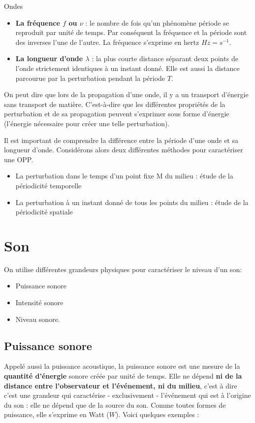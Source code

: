 \documentclass[11pt,a4paper]{article}
\begin{document}
\begin{defn}{Ondes}
\begin{itemize}
\begin{itemize}
        \item \textbf{La fréquence $f$ ou $\nu$} : le nombre de fois qu’un phénomène période se reproduit par unité de temps. Par conséquent la fréquence et la période sont des inverses l’une de l’autre. La fréquence s'exprime en hertz $Hz = s^{-1}$. 
        \item \textbf{La longueur d'onde $\lambda$ }: la plus courte distance séparant deux points de l’onde strictement identiques à un instant donné. Elle est aussi la distance parcourue par la perturbation pendant la période $T$. 
    \end{itemize}
\end{itemize}
\end{defn}
On peut dire que lors de la propagation d'une onde, il y a un transport d'énergie sans transport de matière. C’est-à-dire que les différentes propriétés de la perturbation et de sa propagation peuvent s'exprimer sous forme d'énergie (l'énergie nécessaire pour créer une telle perturbation). 
\begin{rmrq}
Il est important de comprendre la différence entre la période d’une onde et sa longueur d’onde. Considérons alors deux différentes méthodes pour caractériser une OPP. \begin{itemize}
    \item La  perturbation dans le temps d’un point fixe M du milieu : étude de la périodicité temporelle
    \item La perturbation à un instant donné de tous les points du milieu : étude de la périodicité spatiale
\end{itemize}	
\end{rmrq}


\section{Son}
On utilise différentes grandeurs physiques pour caractériser le niveau d’un son: 
\begin{itemize}
    \item Puissance sonore 
    \item Intensité sonore  
    \item Niveau sonore.
\end{itemize}

\subsection{Puissance sonore}

Appelé aussi la puissance acoustique, la puissance sonore est une mesure de la \textbf{quantité d’énergie} sonore créée par unité de temps. Elle ne dépend \textbf{ni de la distance entre l’observateur et l’événement, ni du milieu}, c'est à dire c'est une grandeur qui caractérise - exclusivement - l'événement qui est à l'origine du son : elle ne dépend que de la source du son.  Comme toutes formes de puissance, elle s’exprime en Watt ($W$).  Voici quelques exemples :
\end{document}
